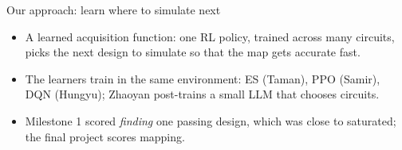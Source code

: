 \begin{frame}{Our approach: learn where to simulate next}
  \centering

  \vspace{3mm}
  \begin{itemize}\small
    \item A \alert{learned acquisition function}: one RL policy, trained across many circuits, picks the next design to
      simulate so that the map gets accurate fast.
    \item The learners train in the \alert{same} environment: ES (Taman), PPO (Samir), DQN (Hungyu); Zhaoyan
      post-trains a small LLM that chooses circuits.
    \item Milestone 1 scored \emph{finding} one passing design, which was close to saturated; the final project
      scores \alert{mapping}.
  \end{itemize}
\end{frame}

